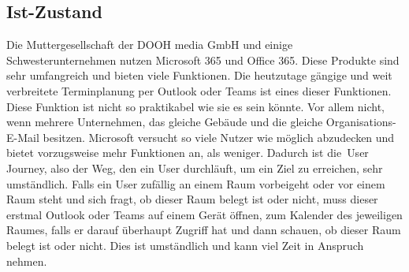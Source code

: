 


\pagebreak
\subsection{Ist-Zustand}\label{sec:ist-zustand}
Die Muttergesellschaft der DOOH media GmbH und einige Schwesterunternehmen nutzen Microsoft 365 und Office 365.
Diese Produkte sind sehr umfangreich und bieten viele Funktionen.
Die heutzutage gängige und weit verbreitete Terminplanung per Outlook oder Teams ist eines dieser Funktionen.
Diese Funktion ist nicht so praktikabel wie sie es sein könnte.
Vor allem nicht, wenn mehrere Unternehmen, das gleiche Gebäude und die gleiche Organisations-E-Mail besitzen.
Microsoft versucht so viele Nutzer wie möglich abzudecken und bietet vorzugsweise mehr Funktionen an, als weniger.
Dadurch ist die~\gls{User Journey}, also der Weg, den ein User durchläuft, um ein Ziel zu erreichen, sehr umständlich.
\newline
\newline
Falls ein User zufällig an einem Raum vorbeigeht oder vor einem Raum steht und sich fragt, ob dieser Raum belegt ist oder nicht, muss dieser erstmal Outlook oder Teams auf einem Gerät öffnen, zum Kalender des jeweiligen Raumes, falls er darauf überhaupt Zugriff hat und dann schauen, ob dieser Raum belegt ist oder nicht.
Dies ist umständlich und kann viel Zeit in Anspruch nehmen.


